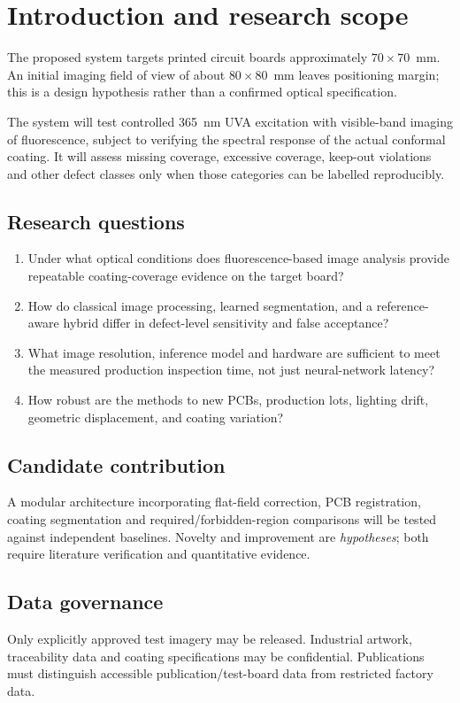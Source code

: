 \section{Introduction and research scope}

The proposed system targets printed circuit boards approximately $70 \times 70$~mm.
An initial imaging field of view of about $80 \times 80$~mm leaves positioning margin;
this is a design hypothesis rather than a confirmed optical specification.

The system will test controlled 365~nm UVA excitation with visible-band imaging
of fluorescence, subject to verifying the spectral response of the actual conformal
coating. It will assess missing coverage, excessive coverage, keep-out violations
and other defect classes only when those categories can be labelled reproducibly.

\subsection{Research questions}
\begin{enumerate}
\item Under what optical conditions does fluorescence-based image analysis
provide repeatable coating-coverage evidence on the target board?
\item How do classical image processing, learned segmentation, and a
reference-aware hybrid differ in defect-level sensitivity and false acceptance?
\item What image resolution, inference model and hardware are sufficient
to meet the measured production inspection time, not just neural-network latency?
\item How robust are the methods to new PCBs, production lots, lighting drift,
geometric displacement, and coating variation?
\end{enumerate}

\subsection{Candidate contribution}
A modular architecture incorporating flat-field correction, PCB registration,
coating segmentation and required/forbidden-region comparisons will be tested
against independent baselines. Novelty and improvement are \emph{hypotheses};
both require literature verification and quantitative evidence.

\subsection{Data governance}
Only explicitly approved test imagery may be released. Industrial artwork,
traceability data and coating specifications may be confidential. Publications
must distinguish accessible publication/test-board data from restricted factory data.
